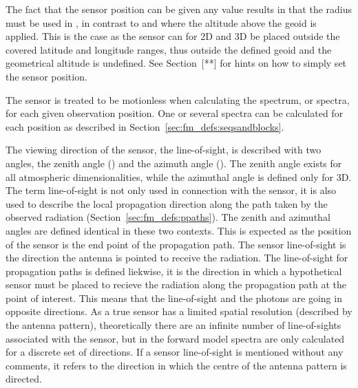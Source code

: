 The fact that the sensor position can be given any value results in
that the radius must be used in , in contrast
to  and  where the altitude
above the geoid is applied. This is the case as the sensor can for 2D
and 3D be placed outside the covered latitude and longitude ranges,
thus outside the defined geoid and the geometrical altitude is
undefined. See Section~[**] for hints on how to simply set the sensor
position.

The sensor is treated to be motionless when calculating the spectrum,
or spectra, for each given observation position. One or several
spectra can be calculated for each position as described in
Section~\ref{sec:fm_defs:seqsandblocks}.


\label{sec:fm_defs:los}

The viewing direction of the sensor, the line-of-sight, is described
with two angles, the zenith angle (\ZntAng) and the azimuth angle
(\AzmAng). The zenith angle exists for all atmospheric
dimensionalities, while the azimuthal angle is defined only for 3D.
The term line-of-sight is not only used in connection with the sensor,
it is also used to describe the local propagation direction along the
path taken by the observed radiation
(Section~\ref{sec:fm_defs:ppaths}).  The zenith and azimuthal angles
are defined identical in these two contexts. This is expected as the
position of the sensor is the end point of the propagation path. The
sensor line-of-sight is the direction the antenna is pointed to
receive the radiation. The line-of-sight for propagation paths is
defined liekwise, it is the direction in which a hypothetical sensor
must be placed to recieve the radiation along the propagation path at
the point of interest. This means that the line-of-sight and the
photons are going in opposite directions. As a true sensor has a
limited spatial resolution (described by the antenna pattern),
theoretically there are an infinite number of line-of-sights
associated with the sensor, but in the forward model spectra are only
calculated for a discrete set of directions. If a sensor line-of-sight
is mentioned without any comments, it refers to the direction in which
the centre of the antenna pattern is directed.

